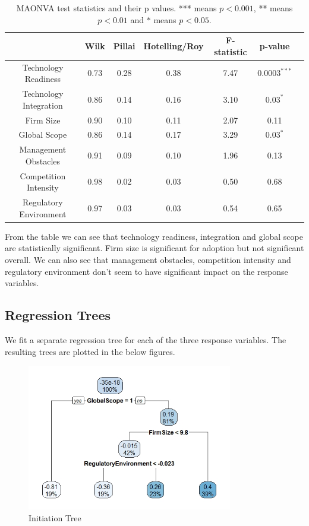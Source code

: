 \documentclass[12pt]{article}
\begin{document}
\begin{table}[H]
\begin{tabular}{|c|c|c|c|c|c|c|}
\hline
                       & Wilk & Pillai & Hotelling/Roy   & F-statistic & p-value        \\ \hline
Technology Readiness   & 0.73 & 0.28   & 0.38              & 7.47        & $0.0003^{***}$ \\ \hline
Technology Integration & 0.86 & 0.14   & 0.16              & 3.10        & $0.03^{*}$     \\ \hline
Firm Size              & 0.90 & 0.10   & 0.11              & 2.07        & 0.11           \\ \hline
Global Scope           & 0.86 & 0.14   & 0.17              & 3.29        & $0.03^*$       \\ \hline
Management Obstacles   & 0.91 & 0.09   & 0.10              & 1.96        & 0.13           \\ \hline
Competition Intensity  & 0.98 & 0.02   & 0.03              & 0.50        & 0.68           \\ \hline
Regulatory Environment & 0.97 & 0.03   & 0.03              & 0.54        & 0.65           \\ \hline
\end{tabular}
\caption{MAONVA test statistics and their p values. *** means $p<0.001$, ** means $p<0.01$ and $*$ means $p<0.05$.}
\label{tab:my-table}
\end{table}
From the table we can see that technology readiness, integration and global scope are statistically significant. Firm size is significant for adoption but not significant overall. We can also see that management obstacles, competition intensity and regulatory environment don't seem to have significant impact on the response variables.

\subsection{Regression Trees}
We fit a separate regression tree for each of the three response variables. The resulting trees are plotted in the below figures. 

\begin{figure}[H]
\centering
\includegraphics[width=0.8\textwidth]{init_tree.jpeg}
\caption{Initiation Tree}
\label{fig:init_tree}
\end{figure}
\end{document}
